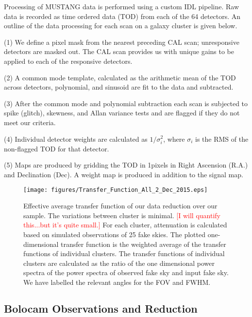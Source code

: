 \documentclass[iop,numberedappendix,apj]{emulateapj}
\begin{document}
Processing of MUSTANG data is performed using a custom IDL pipeline. Raw data is recorded as time ordered data (TOD)
from each of the 64 detectors. An outline of the data processing for each scan on a galaxy cluster is given below.
  
  (1) We define a pixel mask from the nearest preceding CAL scan; unresponsive detectors are masked out.
  The CAL scan provides us with unique gains to be applied to each of the responsive detectors.

  (2) A common mode template, calculated as the arithmetic mean of the TOD across detectors, polynomial, and sinusoid
  are fit to the data and subtracted.

  (3) After the common mode and polynomial subtraction each scan is subjected to spike (glitch), skewness, and Allan 
  variance tests and are flagged if they do not meet our criteria.

  (4) Individual detector weights are calculated as $1/ \sigma_i^2$, where $\sigma_i$ is the RMS of the non-flagged
  TOD for that detector. 

  (5) Maps are produced by gridding the TOD in 1\asec pixels in Right Ascension (R.A.) and Declination (Dec). A weight 
  map is produced in addition to the signal map.



\begin{figure}
  \begin{center}
  \texttt{[image: figures/Transfer\_Function\_All\_2\_Dec\_2015.eps]}
  \end{center}
  \caption{Effective average transfer function of our data reduction over our sample. 
    The variations between cluster is minimal. \textcolor{red}{[I
        will quantify this...but it's quite small.]} For each cluster, attenuation is
    calculated based on simulated observations of 25 fake skies. The plotted one-dimensional
    transfer function is the weighted average of the transfer functions
    of individual clusters. The transfer functions of individual clusters are calculated as
    the ratio of the one dimensional power spectra of the power spectra of observed fake sky
    and input fake sky. We have labelled the relevant angles for the FOV and FWHM.}
  \label{fig:xfer_all}
\end{figure}


\subsection{Bolocam Observations and Reduction}
\label{sec:bolocamredox}
\end{document}
